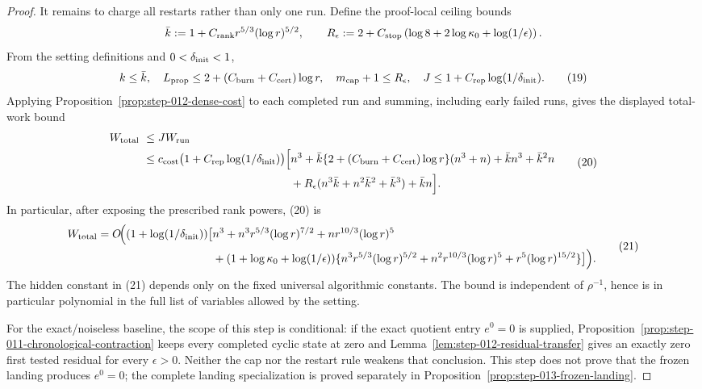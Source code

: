 \begin{proof}
It remains to charge all restarts rather than only one run.  Define the
proof-local ceiling bounds
\[
 \bar k:=1+C_{\rm rank}r^{5/3}(\log r)^{5/2},\qquad
 R_\epsilon:=2+C_{\rm stop}
 \left(\log8+2\log\kappa_0+\log(1/\epsilon)\right).
\]
From the setting definitions and \(0<\delta_{\rm init}<1\),
\[
 k\le\bar k,\quad
 L_{\rm prop}\le2+(C_{\rm burn}+C_{\rm cert})\log r,\quad
 m_{\rm cap}+1\le R_\epsilon,\quad
 J\le1+C_{\rm rep}\log(1/\delta_{\rm init}).
\tag{19}
\]
Applying Proposition~\ref{prop:step-012-dense-cost} to each completed run
and summing, including early failed runs, gives the displayed total-work
bound
\[
\begin{aligned}
 W_{\rm total}\ &\le J W_{\rm run}\\
 &\le c_{\rm cost}\bigl(1+C_{\rm rep}\log(1/\delta_{\rm init})\bigr)
 \Big[ n^3
 +\bar k\{2+(C_{\rm burn}+C_{\rm cert})\log r\}(n^3+n)
 +\bar k n^3+\bar k^2n\\
 &\hspace{46mm}
 +R_\epsilon(n^3\bar k+n^2\bar k^2+\bar k^3)+\bar k n\Big].
\end{aligned}
\tag{20}
\]
In particular, after exposing the prescribed rank powers, (20) is
\[
\begin{aligned}
 W_{\rm total}=O\!\Big((1+\log(1/\delta_{\rm init}))\big[&n^3
 +n^3r^{5/3}(\log r)^{7/2}+nr^{10/3}(\log r)^5\\
 &+(1+\log\kappa_0+\log(1/\epsilon))
 \{n^3r^{5/3}(\log r)^{5/2}
 +n^2r^{10/3}(\log r)^5+r^5(\log r)^{15/2}\}\big]\Big).
\end{aligned}
\tag{21}
\]
The hidden constant in (21) depends only on the fixed universal algorithmic
constants.  The bound is independent of \(\rho^{-1}\), hence is in
particular polynomial in the full list of variables allowed by the setting.

For the exact/noiseless baseline, the scope of this step is conditional: if
the exact quotient entry \(e^0=0\) is supplied,
Proposition~\ref{prop:step-011-chronological-contraction} keeps every completed
cyclic state at zero and Lemma~\ref{lem:step-012-residual-transfer} gives an
exactly zero first tested residual for every \(\epsilon>0\).  Neither the cap
nor the restart rule weakens that conclusion.  This step does not prove that
the frozen landing produces \(e^0=0\); the complete landing specialization is
proved separately in Proposition~\ref{prop:step-013-frozen-landing}.
\end{proof}

